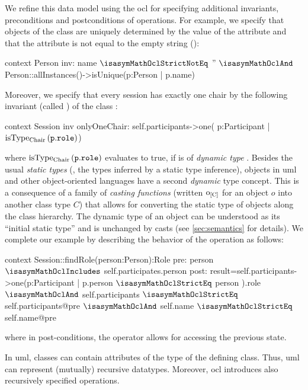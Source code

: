 We refine this data model using the \acf{ocl} for specifying additional
invariants, preconditions and postconditions of operations. For
example, we specify that objects of the class  are
uniquely determined by the value of the  attribute and
that the attribute  is not equal to the empty string
():
\begin{ocl}
context Person
  inv: name $\isasymMathOclStrictNotEq$ '' $\isasymMathOclAnd$
       Person::allInstances()->isUnique(p:Person | p.name)
\end{ocl}
Moreover, we specify that every session has exactly one chair by the
following invariant (called ) of the class
:
\begin{ocl}
context Session
  inv onlyOneChair:
      self.participants->one( p:Participant | $\isType{Chair}{(\mathtt{p.role})}$)
\end{ocl}
where $\isType{Chair}{(\mathtt{p.role})}$ evaluates to true, if
 is of \emph{dynamic type}
. Besides the usual \emph{static types} (\ie, the
types inferred by a static type inference), objects in \acs{uml} and
other object-oriented languages have a second \emph{dynamic} type
concept.  This is a consequence of a family of \emph{casting
  functions} (written $\typeCast{o}{C}$ for an object $o$ into another
class type $C$) that allows for converting the static type of objects
along the class hierarchy. The dynamic type of an object can be
understood as its ``initial static type'' and is unchanged by casts
(see \autoref{sec:semantics} for details). We complete our example by
describing the behavior of the operation  as
follows:
\begin{ocl}
context Session::findRole(person:Person):Role
  pre:  person $\isasymMathOclIncludes$ self.participates.person
  post: result=self.participants->one(p:Participant |
                                p.person $\isasymMathOclStrictEq$ person ).role
        $\isasymMathOclAnd$ self.participants $\isasymMathOclStrictEq$ self.participants@pre
        $\isasymMathOclAnd$ self.name $\isasymMathOclStrictEq$ self.name@pre
\end{ocl}
where in post-conditions, the operator  allows for
accessing the previous state.

In \acs{uml}, classes can contain attributes of the type of the
defining class.  Thus, \acs{uml} can represent (mutually) recursive
datatypes. Moreover, \acs{ocl} introduces also recursively specified
operations.

